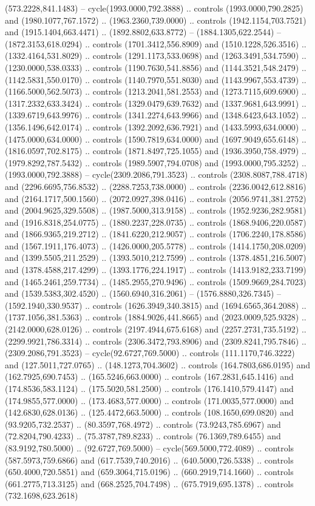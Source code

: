 (573.2228,841.1483) -- cycle(1993.0000,792.3888) .. controls (1993.0000,790.2825) and (1980.1077,767.1572) .. (1963.2360,739.0000) .. controls (1942.1154,703.7521) and (1915.1404,663.4471) .. (1892.8802,633.8772) -- (1884.1305,622.2544) -- (1872.3153,618.0294) .. controls (1701.3412,556.8909) and (1510.1228,526.3516) .. (1332.4164,531.8029) .. controls (1291.1173,533.0698) and (1263.3491,534.7590) .. (1230.0000,538.0333) .. controls (1190.7630,541.8856) and (1144.3521,548.2479) .. (1142.5831,550.0170) .. controls (1140.7970,551.8030) and (1143.9967,553.4739) .. (1166.5000,562.5073) .. controls (1213.2041,581.2553) and (1273.7115,609.6900) .. (1317.2332,633.3424) .. controls (1329.0479,639.7632) and (1337.9681,643.9991) .. (1339.6719,643.9976) .. controls (1341.2274,643.9966) and (1348.6423,643.1052) .. (1356.1496,642.0174) .. controls (1392.2092,636.7921) and (1433.5993,634.0000) .. (1475.0000,634.0000) .. controls (1590.7819,634.0000) and (1697.9049,655.6148) .. (1816.0597,702.8175) .. controls (1871.8497,725.1055) and (1936.3950,758.4979) .. (1979.8292,787.5432) .. controls (1989.5907,794.0708) and (1993.0000,795.3252) .. (1993.0000,792.3888) -- cycle(2309.2086,791.3523) .. controls (2308.8087,788.4718) and (2296.6695,756.8532) .. (2288.7253,738.0000) .. controls (2236.0042,612.8816) and (2164.1717,500.1560) .. (2072.0927,398.0416) .. controls (2056.9741,381.2752) and (2004.9625,329.5508) .. (1987.5000,313.9158) .. controls (1952.9236,282.9581) and (1916.8318,254.0775) .. (1880.2237,228.0735) .. controls (1868.9406,220.0587) and (1866.9365,219.2712) .. (1841.6220,212.9057) .. controls (1706.2240,178.8586) and (1567.1911,176.4073) .. (1426.0000,205.5778) .. controls (1414.1750,208.0209) and (1399.5505,211.2529) .. (1393.5010,212.7599) .. controls (1378.4851,216.5007) and (1378.4588,217.4299) .. (1393.1776,224.1917) .. controls (1413.9182,233.7199) and (1465.2461,259.7734) .. (1485.2955,270.9496) .. controls (1509.9669,284.7023) and (1539.5383,302.4520) .. (1560.6940,316.2061) -- (1576.8880,326.7345) -- (1592.1940,330.9537) .. controls (1626.3949,340.3815) and (1694.6565,364.2088) .. (1737.1056,381.5363) .. controls (1884.9026,441.8665) and (2023.0009,525.9328) .. (2142.0000,628.0126) .. controls (2197.4944,675.6168) and (2257.2731,735.5192) .. (2299.9921,786.3314) .. controls (2306.3472,793.8906) and (2309.8241,795.7846) .. (2309.2086,791.3523) -- cycle(92.6727,769.5000) .. controls (111.1170,746.3222) and (127.5011,727.0765) .. (148.1273,704.3602) .. controls (164.7803,686.0195) and (162.7925,690.7453) .. (165.5246,663.0000) .. controls (167.2831,645.1416) and (174.8536,583.1124) .. (175.5020,581.2500) .. controls (176.1410,579.4147) and (174.9855,577.0000) .. (173.4683,577.0000) .. controls (171.0035,577.0000) and (142.6830,628.0136) .. (125.4472,663.5000) .. controls (108.1650,699.0820) and (93.9205,732.2537) .. (80.3597,768.4972) .. controls (73.9243,785.6967) and (72.8204,790.4233) .. (75.3787,789.8233) .. controls (76.1369,789.6455) and (83.9192,780.5000) .. (92.6727,769.5000) -- cycle(569.5000,772.4089) .. controls (587.5973,759.6866) and (617.7539,740.2016) .. (640.5000,726.5338) .. controls (650.4000,720.5851) and (659.3064,715.0196) .. (660.2919,714.1660) .. controls (661.2775,713.3125) and (668.2525,704.7498) .. (675.7919,695.1378) .. controls (732.1698,623.2618) 